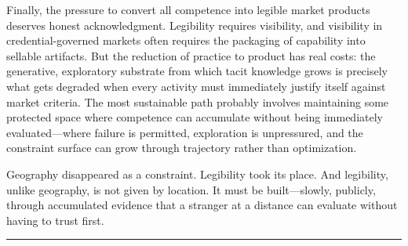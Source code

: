 \documentclass[12pt, a4paper]{article}
\theoremstyle{plain}
\theoremstyle{definition}
\theoremstyle{remark}
\begin{document}
Finally, the pressure to convert all competence into legible market products
deserves honest acknowledgment.
Legibility requires visibility, and visibility in credential-governed markets
often requires the packaging of capability into sellable artifacts.
But the reduction of practice to product has real costs:
the generative, exploratory substrate from which tacit knowledge grows
is precisely what gets degraded when every activity must immediately
justify itself against market criteria.
The most sustainable path probably involves maintaining some protected space
where competence can accumulate without being immediately evaluated---where
failure is permitted, exploration is unpressured, and the constraint surface
can grow through trajectory rather than optimization.

Geography disappeared as a constraint.
Legibility took its place.
And legibility, unlike geography, is not given by location.
It must be built---slowly, publicly, through accumulated evidence
that a stranger at a distance can evaluate without having to trust first.

\vspace{2em}
\begin{center}
\rule{0.4\textwidth}{0.3pt}
\end{center}

\newpage
\end{document}
